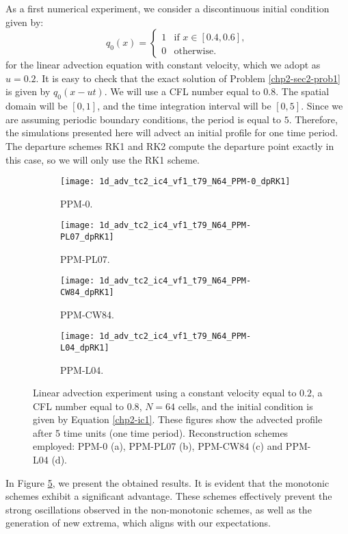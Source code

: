 As a first numerical experiment, we consider
a discontinuous initial condition given by:
\begin{equation}
	\label{chp2-ic1}
		q_0(x) =  
  \begin{cases}
		1 & \text{if } x \in [0.4,0.6],\\
		0 & \text{otherwise}.
  \end{cases}
\end{equation}
for the linear advection equation with constant velocity, which we adopt as $u=0.2$.
It is easy to check that the exact solution of Problem \ref{chp2-sec2-prob1} is given
by $q_0(x-ut)$. We will use a CFL number equal to $0.8$. The spatial domain will be
$[0,1]$, and the time integration interval will be $[0,5]$. Since we are assuming
periodic boundary conditions, the period is equal to $5$. Therefore, the simulations
presented here will advect an initial profile for one time period.
The departure schemes RK1 and RK2 compute the departure point exactly in this case, so we will only use the RK1 scheme.
\begin{figure}[!htb]
  \centering
  \begin{subfigure}{0.49\textwidth}
    \centering
			\texttt{[image: 1d\_adv\_tc2\_ic4\_vf1\_t79\_N64\_PPM-0\_dpRK1]}
			\caption{PPM-0.\label{chp2-sec-exp-adv1-a}}
  \end{subfigure}
  \begin{subfigure}{0.49\textwidth}
    \centering
			\texttt{[image: 1d\_adv\_tc2\_ic4\_vf1\_t79\_N64\_PPM-PL07\_dpRK1]}
			\caption{PPM-PL07.\label{chp2-sec-exp-adv1-b}}
  \end{subfigure}

  \begin{subfigure}{0.49\textwidth}
    \centering
		\texttt{[image: 1d\_adv\_tc2\_ic4\_vf1\_t79\_N64\_PPM-CW84\_dpRK1]}
    \caption{PPM-CW84.\label{chp2-sec-exp-adv1-c}}
  \end{subfigure}
  \begin{subfigure}{0.49\textwidth}
    \centering
			\texttt{[image: 1d\_adv\_tc2\_ic4\_vf1\_t79\_N64\_PPM-L04\_dpRK1]}
      \caption{PPM-L04.\label{chp2-sec-exp-adv1-d}}
  \end{subfigure} 
	\caption{Linear advection experiment using a constant velocity equal to $0.2$,
		a CFL number equal to $0.8$, $N=64$ cells, and the initial condition is given by Equation \eqref{chp2-ic1}.
		These figures show the advected profile after 5 time units (one time period).
		Reconstruction schemes employed: PPM-0 (a), PPM-PL07 (b), PPM-CW84
		(c) and PPM-L04 (d).\label{chp2-sec-exp-adv1}}
\end{figure}
In Figure \ref{chp2-sec-exp-adv1}, we present the obtained results.
It is evident that the monotonic schemes exhibit a significant advantage.
These schemes effectively prevent the strong oscillations observed in the non-monotonic schemes,
as well as the generation of new extrema, which aligns with our expectations.

